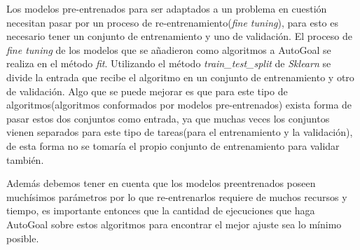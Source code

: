 \begin{recomendations}
    Los modelos pre-entrenados para ser adaptados a un problema en cuestión necesitan pasar por un proceso de re-entrenamiento(\textit{fine tuning}), para esto es necesario tener un conjunto de entrenamiento y uno de validación. El proceso de \textit{fine tuning} de los modelos que se añadieron como algoritmos a AutoGoal se realiza en el método \textit{fit}. Utilizando el método \textit{train\_test\_split} de \textit{Sklearn} se divide la entrada que recibe el algoritmo en un conjunto de entrenamiento y otro de validación. Algo que se puede mejorar es que para este tipo de algoritmos(algoritmos conformados por modelos pre-entrenados) exista forma de pasar estos dos conjuntos como entrada, ya que muchas veces los conjuntos vienen separados para este tipo de tareas(para el entrenamiento y la validación), de esta forma no se tomaría el propio conjunto de entrenamiento para validar también.

    Además debemos tener en cuenta que los modelos preentrenados poseen muchísimos parámetros por lo que re-entrenarlos requiere de muchos recursos y tiempo, es importante entonces que la cantidad de ejecuciones que haga AutoGoal sobre estos algoritmos para encontrar el mejor ajuste sea lo mínimo posible.
\end{recomendations}
